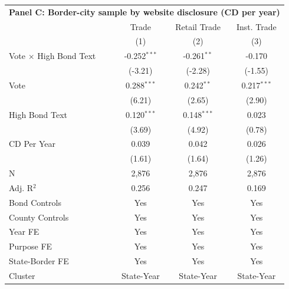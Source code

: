 \begingroup
\centering
\begin{tabular*}{\textwidth}{@{\extracolsep{\fill}}lccc}
\multicolumn{5}{l}{\textbf{Panel C: Border-city sample by website disclosure (CD per year)}}\\

\addlinespace
   \toprule
                                 & Trade          & Retail Trade  & Inst. Trade\\  
                                 & (1)            & (2)           & (3)\\  
   \midrule 
   Vote $\times$ High Bond Text  & -0.252$^{***}$ & -0.261$^{**}$ & -0.170\\   
                                 & (-3.21)       & (-2.28)      & (-1.55)\\   
   Vote                          & 0.288$^{***}$  & 0.242$^{**}$  & 0.217$^{***}$\\   
                                 & (6.21)        & (2.65)       & (2.90)\\   
   High Bond Text                & 0.120$^{***}$  & 0.148$^{***}$ & 0.023\\   
                                 & (3.69)        & (4.92)       & (0.78)\\   
   CD Per Year                   & 0.039          & 0.042         & 0.026\\   
                                 & (1.61)        & (1.64)       & (1.26)\\   
   \hline
   N                  & 2,876          & 2,876         & 2,876\\  
   Adj. R$^2$                & 0.256          & 0.247         & 0.169\\  
   Bond Controls                 & Yes            & Yes           & Yes\\  
   County Controls               & Yes            & Yes           & Yes\\  
   Year FE                       & Yes            & Yes           & Yes\\  
   Purpose FE                    & Yes            & Yes           & Yes\\  
   State-Border FE               & Yes            & Yes           & Yes\\  
   Cluster              & State-Year & State-Year & State-Year\\  
   \bottomrule
\end{tabular*}
\par\endgroup
